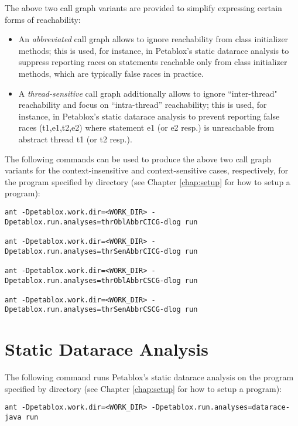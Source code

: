 The above two call graph variants are provided to simplify expressing
certain forms of reachability:
\begin{itemize}
\item
An {\it abbreviated} call graph allows to ignore reachability from
class initializer methods;
this is used, for instance, in Petablox's static datarace analysis to
suppress reporting races on statements reachable only from class initializer
methods, which are typically false races in practice.
\item
A {\it thread-sensitive} call graph additionally allows to ignore
``inter-thread" reachability and focus on ``intra-thread'' reachability; this is
used, for instance, in Petablox's static datarace analysis to prevent reporting
false races (t1,e1,t2,e2) where statement e1 (or e2 resp.) is unreachable from
abstract thread t1 (or t2 resp.).
\end{itemize}

The following commands can be used to produce the above two call graph variants
for the context-insensitive and context-sensitive cases, respectively, for the
program specified by directory  (see Chapter \ref{chap:setup}
for how to setup a program):

\begin{framed}
\begin{verbatim}
ant -Dpetablox.work.dir=<WORK_DIR> -Dpetablox.run.analyses=thrOblAbbrCICG-dlog run

ant -Dpetablox.work.dir=<WORK_DIR> -Dpetablox.run.analyses=thrSenAbbrCICG-dlog run

ant -Dpetablox.work.dir=<WORK_DIR> -Dpetablox.run.analyses=thrOblAbbrCSCG-dlog run

ant -Dpetablox.work.dir=<WORK_DIR> -Dpetablox.run.analyses=thrSenAbbrCSCG-dlog run
\end{verbatim}
\end{framed}


\section{Static Datarace Analysis}

The following command runs Petablox's static datarace analysis on the
program specified by directory  (see Chapter \ref{chap:setup}
for how to setup a program):

\begin{framed}
\begin{verbatim}
ant -Dpetablox.work.dir=<WORK_DIR> -Dpetablox.run.analyses=datarace-java run
\end{verbatim}
\end{framed}

